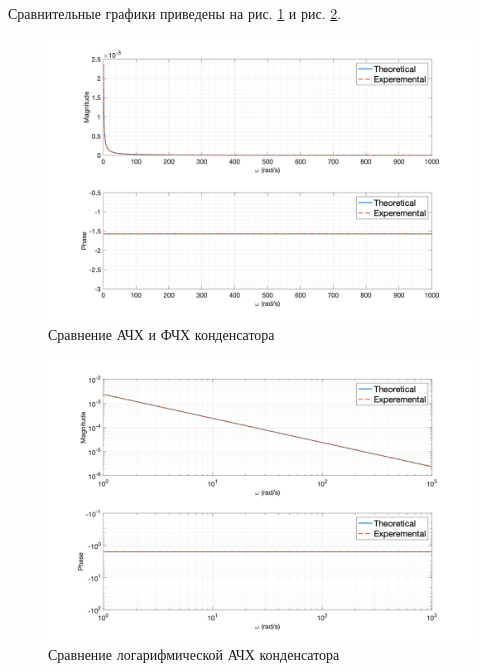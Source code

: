 Сравнительные графики приведены на рис. \ref{fig:task3_freq_resp_cmp_lin} и рис. \ref{fig:task3_freq_resp_cmp_loglog}.
\begin{figure}[ht!]
    \centering
    \includegraphics[width=\textwidth]{media/plots/task3_freq_resp_cmp_lin.png}
    \caption{Сравнение АЧХ и ФЧХ конденсатора}
    \label{fig:task3_freq_resp_cmp_lin}
\end{figure}
\begin{figure}[ht!]
    \centering
    \includegraphics[width=\textwidth]{media/plots/task3_freq_resp_cmp_loglog.png}
    \caption{Сравнение логарифмической АЧХ конденсатора}
    \label{fig:task3_freq_resp_cmp_loglog}
\end{figure}

